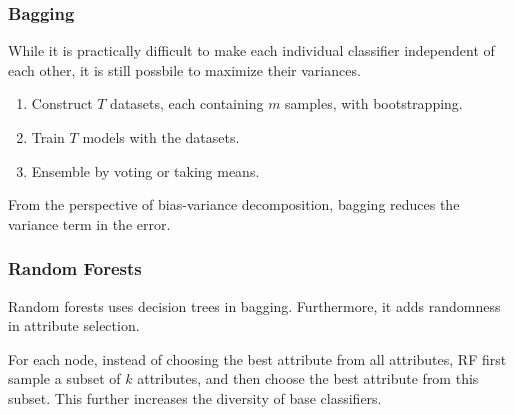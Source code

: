         \subsubsection{Bagging}
        While it is practically difficult to make each individual classifier independent of each other, it is still possbile to maximize their variances.
        \begin{enumerate}
            \item Construct $T$ datasets, each containing $m$ samples, with bootstrapping.
            \item Train $T$ models with the datasets.
            \item Ensemble by voting or taking means.
        \end{enumerate}
        \begin{remark}
            From the perspective of bias-variance decomposition, bagging reduces the variance term in the error.
        \end{remark}

        \subsubsection{Random Forests}
        Random forests uses decision trees in bagging. Furthermore, it adds randomness in attribute selection.

        For each node, instead of choosing the best attribute from all attributes, RF first sample a subset of $k$ attributes, and then choose the best attribute from this subset. This further increases the diversity of base classifiers.